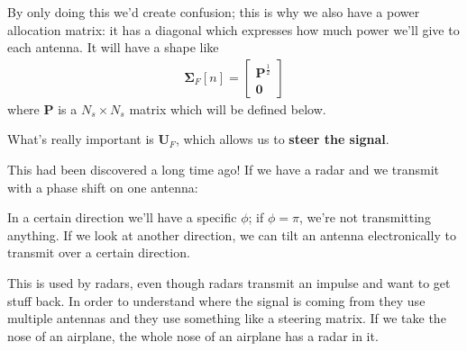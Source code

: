\documentclass[a4paper, 12pt]{book}
\begin{document}
By only doing this we'd create confusion; this is why we also have a power allocation matrix: it has a diagonal which expresses how much power we'll give to each antenna.
It will have a shape like
\begin{align}
\mathbf{\Sigma}_F[n] = \begin{bmatrix} \mathbf{P}^{\frac{1}{2}} \\ \mathbf{0} \end{bmatrix} \tag{2.101}
\end{align}
where $\mathbf{P}$ is a $N_s \times N_s$ matrix which will be defined below.

What's really important is $\mathbf{U}_F$, which allows us to \textbf{steer the signal}.

This had been discovered a long time ago! If we have a radar and we transmit with a phase shift on one antenna:

\begin{center}
\end{center}

In a certain direction we'll have a specific $\phi$; if $\phi = \pi$, we're not transmitting anything.
If we look at another direction, we can tilt an antenna electronically to transmit over a certain direction.


This is used by radars, even though radars transmit an impulse and want to get stuff back. In order to understand where the signal is coming from they use multiple antennas and they use something like a steering matrix.
If we take the nose of an airplane, the whole nose of an airplane has a radar in it.
\end{document}
